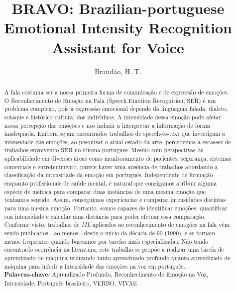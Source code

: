 \documentclass[12pt]{report}
\title{\textbf{BRAVO: Brazilian-portuguese Emotional Intensity Recognition Assistant for Voice}}
\author{Brandão, H. T.}
\begin{document}
\maketitle

\begin{abstract}
A fala costuma ser a nossa primeira forma de comunicação e de expressão de emoções. O Reconhecimento de Emoção na Fala (Speech Emotion Recognition, SER) é um problema complexo, pois a expressão emocional depende da linguagem falada, dialeto, sotaque e histórico cultural dos indivíduos. A intensidade dessa emoção pode afetar nossa percepção das emoções e nos induzir a interpretar a informação de forma inadequada. Embora sejam encontrados trabalhos de speech-to-text que investigam a intensidade das emoções, ao pesquisar o atual estado da arte, percebemos a escassez de trabalhos envolvendo SER no idioma portugues. Mesmo com perspectivas de aplicabilidade em diversas áreas como monitoramento de pacientes, segurança, sistemas comerciais e entretenimento, parece haver uma ausência de trabalhos abordando a classificação da intensidade da emoção em português. Independente de formação enquanto profissionais de saúde mental, é natural que consigamos atribuir alguma espécie de métrica para comparar duas instâncias de uma mesma emoção que tenhamos sentido. Assim, conseguimos experienciar e comparar intensidades distintas para uma mesma emoção. Portanto, somos capazes de identificar emoções, quantificar sua intensidade e calcular uma distância para poder efetuar essa comparação. Conforme visto, trabalhos de \textit{ML} aplicados ao reconhecimento de emoções na fala vêm sendo publicados - ao menos - desde o início da década de 90 (1990), e se tornam menos frequentes quando buscamos por tarefas mais especializadas. Não tendo encontrado ocorrência na literatura, este trabalho se propõe a realizar uma tarefa de aprendizado de máquina utilizando tanto aprendizado profundo quanto aprendizado de máquina para inferir a intensidade das emoções na voz em português.\\

\noindent \textbf{Palavras-chave:} Aprendizado Profundo, Reconhecimento de Emoção na Voz, Intensidade, Português brasileiro, VERBO, VIVAE
\end{abstract}
\clearpage
\end{document}
